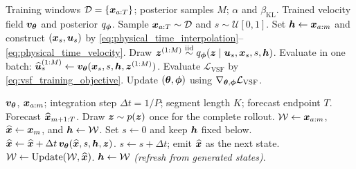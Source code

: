 \noindent
\begin{minipage}[t]{0.485\linewidth}
\vspace{0pt}
\begin{algorithm}[H]
\caption{VSF training}
\label{alg:vsf-training}
\begin{vsfalgorithmic}
\VSFInput Training windows $\mathcal D=\{{\bm{x}}_{a:T}\}$;
posterior samples $M$; $\alpha$ and $\beta_{\mathrm{KL}}$.
\VSFOutput Trained velocity field ${\bm{v}}_{{\bm{\theta}}}$ and posterior $q_{\boldsymbol{\phi}}$.
  \VSFState Sample ${\bm{x}}_{a:T}\sim\mathcal D$ and $s\sim\mathcal U[0,1]$.
  \VSFState Set ${\bm{h}}\gets {\bm{x}}_{a:m}$ and construct $({\bm{x}}_s,{\bm{u}}_s)$ by
  \eqref{eq:physical_time_interpolation}--\eqref{eq:physical_time_velocity}.
  \VSFState Draw ${\bm{z}}^{(1:M)}\stackrel{\mathrm{iid}}{\sim}
  q_{\boldsymbol{\phi}}({\bm{z}}\mid{\bm{u}}_s,{\bm{x}}_s,s,{\bm{h}})$.
  \VSFState Evaluate in one batch: $\widehat{{\bm{u}}}_s^{(1:M)}\gets
  {\bm{v}}_{{\bm{\theta}}}({\bm{x}}_s,s,{\bm{h}},{\bm{z}}^{(1:M)})$.
  \VSFState Evaluate $\mathcal L_{\mathrm{VSF}}$ by
  \eqref{eq:vsf_training_objective}.
  \VSFState Update $({\bm{\theta}},\boldsymbol{\phi})$ using
  $\nabla_{{\bm{\theta}},\boldsymbol{\phi}}\mathcal L_{\mathrm{VSF}}$.
\VSFEndWhile
\end{vsfalgorithmic}
\end{algorithm}
\end{minipage}\hfill
\begin{minipage}[t]{0.485\linewidth}
\vspace{0pt}
\begin{algorithm}[H]
\caption{VSF inference}
\label{alg:vsf-inference}
\begin{vsfalgorithmic}
\VSFInput ${\bm{v}}_{{\bm{\theta}}}$, ${\bm{x}}_{a:m}$; integration
step $\Delta t=1/P$; segment length $K$; forecast endpoint $T$.
\VSFOutput Forecast $\widehat{{\bm{x}}}_{m+1:T}$.
\VSFState Draw ${\bm{z}}\sim p({\bm{z}})$ once for the complete rollout.
\VSFState $\mathcal W\gets{\bm{x}}_{a:m}$, $\widehat{{\bm{x}}}\gets{\bm{x}}_m$, and
${\bm{h}}\gets \mathcal W$.
  \VSFState Set $s\gets0$ and keep ${\bm{h}}$ fixed below.
    \VSFState $\widehat{{\bm{x}}}\gets\widehat{{\bm{x}}}
    +\Delta t\,{\bm{v}}_{{\bm{\theta}}}(\widehat{{\bm{x}}},s,{\bm{h}},{\bm{z}})$.
    \VSFState $s\gets s+\Delta t$; emit $\widehat{{\bm{x}}}$ as the next state.
    \VSFState $\mathcal W\gets
    \operatorname{Update}(\mathcal W,\widehat{{\bm{x}}})$.
  \VSFEndFor
  \VSFState ${\bm{h}}\gets \mathcal W$ \emph{(refresh from generated states)}.
\VSFEndWhile
\end{vsfalgorithmic}
\end{algorithm}
\end{minipage}\par

